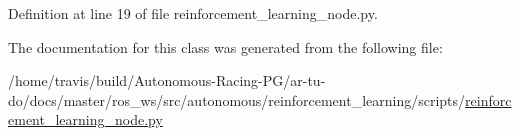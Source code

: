 Definition at line 19 of file reinforcement\+\_\+learning\+\_\+node.\+py.



The documentation for this class was generated from the following file\+:\begin{DoxyCompactItemize}
\item 
/home/travis/build/\+Autonomous-\/\+Racing-\/\+P\+G/ar-\/tu-\/do/docs/master/ros\+\_\+ws/src/autonomous/reinforcement\+\_\+learning/scripts/\hyperlink{reinforcement__learning__node_8py}{reinforcement\+\_\+learning\+\_\+node.\+py}\end{DoxyCompactItemize}

